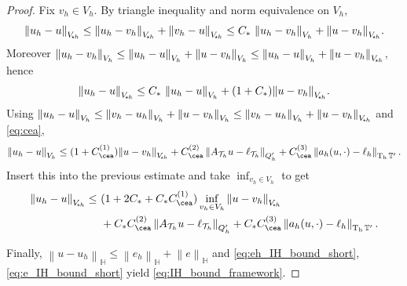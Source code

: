 \documentclass[11pt]{article}
\theoremstyle{definition}
\theoremstyle{plain}
\newcommand{\CD}{C_*}
\newcommand{\Vsh}{V_{\!\star \hspace*{-0.2mm}h}}
\newcommand{\dgnorm}[1]{\norm{#1}_{V_h}}
\newcommand{\tdgnorm}[1]{{\Vert#1\Vert}_{\Vsh}}
\newcommand{\Th}{{\calT_h}}
\newcommand{\Qh}{Q_h}
\newcommand{\ATh}{A_{\Th}}
\DeclareMathOperator{\tch}{T_h}
\newcommand*{\norm}[1]{\left\|#1\right\|}
\newcommand{\IH}{\mathbb{H}}
\newcommand{\ITh}{\mathbb{T}}
\newcommand{\calT}{\mathcal{T}}
\begin{document}
\begin{proof}
Fix $v_h\in V_h$. By triangle inequality and norm equivalence on $V_h$,
\[
\tdgnorm{u_h-u}\le \tdgnorm{u_h-v_h}+\tdgnorm{v_h-u}
\le \CD\,\dgnorm{u_h-v_h}+\tdgnorm{u-v_h}.
\]
Moreover $\dgnorm{u_h-v_h}\le \dgnorm{u_h-u}+\dgnorm{u-v_h}\le \dgnorm{u_h-u}+\tdgnorm{u-v_h}$, hence
\[
\tdgnorm{u_h-u}\le \CD\,\dgnorm{u_h-u}+(1+\CD)\tdgnorm{u-v_h}.
\]
Using $\dgnorm{u_h-u}\le \dgnorm{v_h-u_h}+\dgnorm{u-v_h}\le \dgnorm{v_h-u_h}+\tdgnorm{u-v_h}$ and \eqref{eq:cea},
\[
\dgnorm{u_h-u}\le (1+C_{\cea}^{(1)})\tdgnorm{u-v_h}
+ C_{\cea}^{(2)}\norm{\ATh u-\ell_\Th}_{\Qh'}
+ C_{\cea}^{(3)}\norm{a_h(u,\cdot)-\ell_h}_{\tch\ITh'} .
\]
Insert this into the previous estimate and take $\inf_{v_h\in V_h}$ to get
\begin{align*}
\tdgnorm{u_h-u}\le\ &
(1+2\CD+\CD C_{\cea}^{(1)})\inf_{v_h\in V_h}\tdgnorm{u-v_h}\\
&+ \CD C_{\cea}^{(2)}\norm{\ATh u-\ell_\Th}_{\Qh'}
+ \CD C_{\cea}^{(3)}\norm{a_h(u,\cdot)-\ell_h}_{\tch\ITh'} .
\end{align*}

Finally, $\norm{u-u_h}_{\IH}\le \norm{e_h}_{\IH}+\norm{e}_{\IH}$ and \eqref{eq:eh_IH_bound_short}, \eqref{eq:e_IH_bound_short}
yield \eqref{eq:IH_bound_framework}.
\end{proof}
\end{document}
